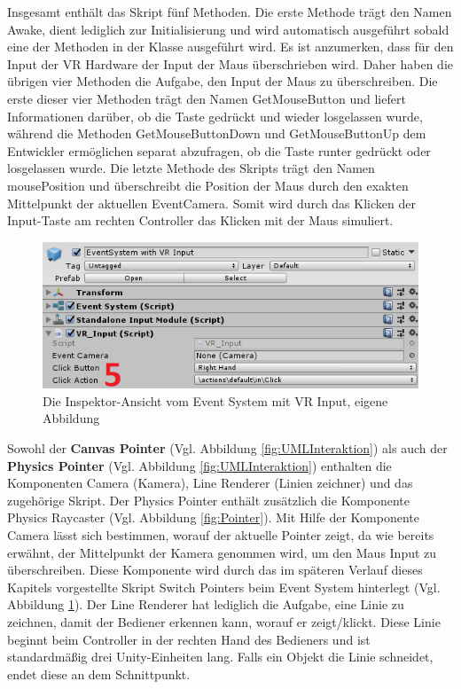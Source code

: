 Insgesamt enthält das Skript fünf Methoden. Die erste Methode trägt den Namen Awake, dient lediglich zur Initialisierung und wird automatisch ausgeführt sobald eine der Methoden in der Klasse ausgeführt wird. Es ist anzumerken, dass für den Input der VR Hardware der Input der Maus überschrieben wird. Daher haben die übrigen vier Methoden die Aufgabe, den Input der Maus zu überschreiben. Die erste dieser vier Methoden trägt den Namen GetMouseButton und liefert Informationen darüber, ob die Taste gedrückt und wieder losgelassen wurde, während die Methoden GetMouseButtonDown und GetMouseButtonUp dem Entwickler ermöglichen separat abzufragen, ob die Taste runter gedrückt oder losgelassen wurde. Die letzte Methode des Skripts trägt den Namen mousePosition und überschreibt die Position der Maus durch den exakten Mittelpunkt der aktuellen EventCamera. Somit wird durch das Klicken der Input-Taste am rechten Controller das Klicken mit der Maus simuliert.
\begin{figure}[h]
	\centering
	\includegraphics[width=0.5\linewidth]{Bilder/A41_EventSystem2}
	\caption{Die Inspektor-Ansicht vom Event System mit VR Input, eigene Abbildung}
	\label{fig:EventSystem}
\end{figure}
\newline
Sowohl der \textbf{Canvas Pointer} (Vgl. Abbildung \ref{fig:UMLInteraktion}) als auch der \textbf{Physics Pointer} (Vgl. Abbildung \ref{fig:UMLInteraktion}) enthalten die Komponenten Camera (Kamera), Line Renderer (Linien zeichner) und das zugehörige Skript. Der Physics Pointer enthält zusätzlich die Komponente Physics Raycaster (Vgl. Abbildung \ref{fig:Pointer}). Mit Hilfe der Komponente Camera lässt sich bestimmen, worauf der aktuelle Pointer zeigt, da wie bereits erwähnt, der Mittelpunkt der Kamera genommen wird, um den Maus Input zu überschreiben. Diese Komponente wird durch das im späteren Verlauf dieses Kapitels vorgestellte Skript Switch Pointers beim Event System hinterlegt (Vgl. Abbildung \ref{fig:EventSystem}). Der Line Renderer hat lediglich die Aufgabe, eine Linie zu zeichnen, damit der Bediener erkennen kann, worauf er zeigt/klickt. Diese Linie beginnt beim Controller in der rechten Hand des Bedieners und ist standardmäßig drei Unity-Einheiten lang. Falls ein Objekt die Linie schneidet, endet diese an dem Schnittpunkt. 
